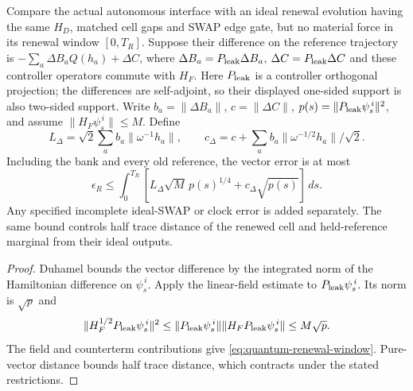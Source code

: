 \begin{proposition}
\label{prop:quantum-port-renewal}
Compare the actual autonomous interface with an ideal renewal evolution
having the same $H_D$, matched cell gaps and SWAP edge gate,
but no material force in its renewal window $[0,T_R]$.
Suppose their difference on the reference trajectory is
$-\sum_a\Delta B_aQ(h_a)+\Delta C$, where
$\Delta B_a=P_{\rm leak}\Delta B_a$,
$\Delta C=P_{\rm leak}\Delta C$ and these controller operators commute
with $H_F$. Here $P_{\rm leak}$ is a controller orthogonal projection;
the differences are self-adjoint, so their displayed one-sided support
is also two-sided support. Write $b_a=\|\Delta B_a\|$,
$c=\|\Delta C\|$, $p(s)=\|P_{\rm leak}\psi_s^{\,i}\|^2$,
and assume $\|H_F\psi_s^{\,i}\|\le M$.
Define
\[
 L_\Delta=\sqrt2\sum_a b_a\|\omega^{-1}h_a\|,\qquad
 c_\Delta=c+\sum_a b_a\|\omega^{-1/2}h_a\|/\sqrt2 .
\]
Including the bank and every old reference, the vector error is at most
\begin{equation}
 \epsilon_R\le\int_0^{T_R}
       [L_\Delta\sqrt M\,p(s)^{1/4}
                    +c_\Delta\sqrt{p(s)}]\,ds .
 \label{eq:quantum-renewal-window}
\end{equation}
Any specified incomplete ideal-SWAP or clock error is added separately.
The same bound controls half trace distance of the renewed cell and
held-reference marginal from their ideal outputs.
\end{proposition}
\begin{proof}
Duhamel bounds the vector difference by the integrated norm of the
Hamiltonian difference on $\psi_s^{\,i}$.
Apply the linear-field estimate to $P_{\rm leak}\psi_s^{\,i}$.
Its norm is $\sqrt p$ and
\[
 \|H_F^{1/2}P_{\rm leak}\psi_s^{\,i}\|^2
 \le\|P_{\rm leak}\psi_s^{\,i}\|
                    \|H_FP_{\rm leak}\psi_s^{\,i}\|
 \le M\sqrt p .
\]
The field and counterterm contributions give
\eqref{eq:quantum-renewal-window}. Pure-vector distance bounds half
trace distance, which contracts under the stated restrictions.
\end{proof}

